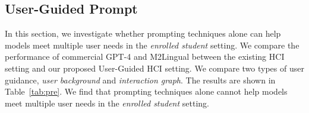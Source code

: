 \documentclass{article} %
\theoremstyle{definition}
\begin{document}
\begin{table}[t]
  \begin{minipage}{0.5\linewidth}
    \label{tab:pre}
    \centering
  \end{minipage}
  \hspace{0.2cm}
  \begin{minipage}{0.5\linewidth}
    
    \caption{User-Guided Prompt experiments on U-CAN.
    The scores are all from human annotation.
    \label{tab:guided}
    }    
    \centering
  \end{minipage}
\end{table}


\subsection{User-Guided Prompt}
\label{subsec:prompt}

In this section, we investigate whether prompting techniques alone can help models meet multiple user needs in the \textit{enrolled student} setting.
We compare the performance of commercial GPT-4 and M2Lingual between the existing HCI setting and our proposed User-Guided HCI setting.
We compare two types of user guidance, \textit{user background} and \textit{interaction graph}.
The results are shown in Table~\ref{tab:pre}.
We find that prompting techniques alone cannot help models meet multiple user needs in the \textit{enrolled student} setting.
\end{document}
